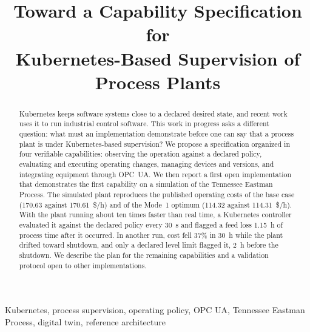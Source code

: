 \documentclass[conference]{IEEEtran}
\begin{document}
\title{Toward a Capability Specification for\\
Kubernetes-Based Supervision of Process Plants}

\author{
\and
{}
}

\maketitle

\begin{abstract}
Kubernetes keeps software systems close to a declared desired state, and recent work uses it to run industrial control software. This work in progress asks a different question: what must an implementation demonstrate before one can say that a process plant is under Kubernetes-based supervision? We propose a specification organized in four verifiable capabilities: observing the operation against a declared policy, evaluating and executing operating changes, managing devices and versions, and integrating equipment through OPC~UA. We then report a first open implementation that demonstrates the first capability on a simulation of the Tennessee Eastman Process. The simulated plant reproduces the published operating costs of the base case (170.63 against 170.61~\$/h) and of the Mode~1 optimum (114.32 against 114.31~\$/h). With the plant running about ten times faster than real time, a Kubernetes controller evaluated it against the declared policy every 30~s and flagged a feed loss 1.15~h of process time after it occurred. In another run, cost fell 37\% in 30~h while the plant drifted toward shutdown, and only a declared level limit flagged it, 2~h before the shutdown. We describe the plan for the remaining capabilities and a validation protocol open to other implementations.
\end{abstract}

\begin{IEEEkeywords}
Kubernetes, process supervision, operating policy, OPC UA, Tennessee Eastman Process, digital twin, reference architecture
\end{IEEEkeywords}
\end{document}
